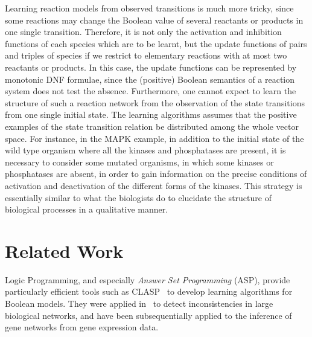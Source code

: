 \documentclass{llncs}
\begin{document}
  Learning reaction models from observed transitions is much more tricky,
  since some reactions may change the Boolean value of several reactants or products in one single transition.
  Therefore, it is not only the activation and inhibition functions of each species which are to be learnt,
  but the update functions of pairs and triples of species if we restrict to elementary reactions with at most two reactants or products.
  In this case, the update functions can be represented by monotonic DNF formulae, since the (positive) Boolean semantics of a reaction system does not test the absence.
Furthermore,   one cannot expect to learn the structure of such a reaction network
from the observation of the state transitions from one single initial state.
The learning algorithms assumes that the positive examples of the state transition relation be distributed
among the whole vector space.
For instance, in the MAPK example, in addition to the initial state of the wild type organism where all the kinases and phosphatases are present,
it is necessary to consider some mutated organisms, in which some kinases or phosphatases are absent,
in order to gain information on the precise conditions of activation and deactivation of the different forms of the kinases.
This strategy is essentially similar to what the biologists do to elucidate the structure of biological processes
in a qualitative manner.


\section{Related Work}

Logic Programming, and especially \emph{Answer Set Programming} (ASP), provide particularly efficient tools such as CLASP~\cite{GKNS07lpnmr} to develop learning algorithms for Boolean models.
They were applied in~\cite{GSTUV08iclp} to detect inconsistencies in large biological networks,
and have been subsequentially applied to the inference of gene networks from gene expression data.
\end{document}
